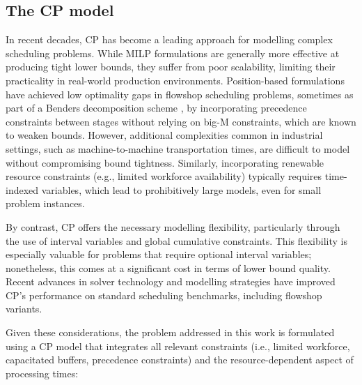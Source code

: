 \documentclass[a4paper,final]{article}
\begin{document}
    \subsection{The CP model}
In recent decades, CP has become a leading approach for modelling complex scheduling problems. While MILP formulations are generally more effective at producing tight lower bounds, they suffer from poor scalability, limiting their practicality in real-world production environments. Position-based formulations \cite{ruiz14} have achieved low optimality gaps in flowshop scheduling problems, sometimes as part of a Benders decomposition scheme \cite{ruiz20}, by incorporating precedence constraints between stages without relying on big-M constraints, which are known to weaken bounds. However, additional complexities common in industrial settings, such as machine-to-machine transportation times, are difficult to model without compromising bound tightness. Similarly, incorporating renewable resource constraints (e.g., limited workforce availability) typically requires time-indexed variables, which lead to prohibitively large models, even for small problem instances.
        
By contrast, CP offers the necessary modelling flexibility, particularly through the use of interval variables and global cumulative constraints. This flexibility is especially valuable for problems that require optional interval variables; nonetheless, this comes at a significant cost in terms of lower bound quality. Recent advances in solver technology and modelling strategies have improved CP’s performance on standard scheduling benchmarks, including flowshop variants.

Given these considerations, the problem addressed in this work is formulated using a CP model that integrates all relevant constraints (i.e., limited workforce, capacitated buffers, precedence constraints) and the resource-dependent aspect of processing times:
\end{document}

